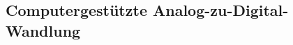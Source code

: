\subsection{Computergestützte Analog-zu-Digital-Wandlung} %
\label{sub:Computergestützte_Analog-zu-Digital-Wandlung}

